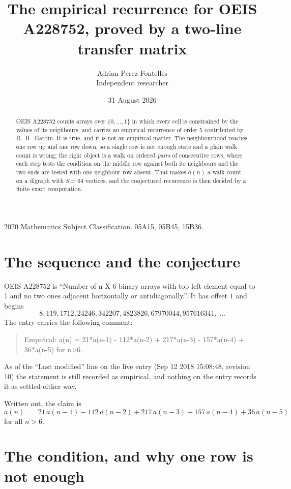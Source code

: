 \documentclass[11pt,a4paper]{article}
\title{The empirical recurrence for OEIS A228752, proved by a two-line transfer matrix}
\author{Adrian Perez Fontelles\\ \small Independent researcher}
\date{31 August 2026}
\theoremstyle{plain}
\theoremstyle{definition}
\begin{document}
\maketitle

\begin{abstract}
OEIS A228752 counts arrays over $\{0,\dots,1\}$ in which every cell is constrained by the
values of its neighbours, and carries an empirical recurrence of order $5$ contributed
by R.~H.~Hardin. It is true, and it is not an empirical matter. The neighbourhood reaches one
row up and one row down, so a single row is not enough state and a plain walk count
is wrong; the right object is a walk on ordered \emph{pairs} of consecutive rows, where
each step tests the condition on the middle row against both its neighbours and the two
ends are tested with one neighbour row absent. That makes $a(n)$ a walk count on a digraph
with $S=64$ vertices, and the conjectured recurrence is then decided by a finite exact
computation.
\end{abstract}

\noindent\small 2020 Mathematics Subject Classification. 05A15, 05B45, 15B36.\normalsize

\section{The sequence and the conjecture}

OEIS A228752 is ``Number of n X 6 binary arrays with top left element equal to 1 and no two ones adjacent horizontally or antidiagonally.''. It has offset $1$ and begins
\[
8, 119, 1712, 24246, 342207, 4823826, 67970044, 957616341,\ \dots
\]
The entry carries the following comment:
\begin{quote}\small
Empirical: a(n) = 21*a(n-1) - 112*a(n-2) + 217*a(n-3) - 157*a(n-4) + 36*a(n-5) for n>6.
\end{quote}
As of the ``Last modified'' line on the live entry (Sep 12 2018 15:08:48, revision 10) the statement is
still recorded as empirical, and nothing on the entry records it as settled either way.

Written out, the claim is
\begin{equation}\label{eq:conj}
a(n)\;=\;21\,a(n-1) - 112\,a(n-2) + 217\,a(n-3) - 157\,a(n-4) + 36\,a(n-5)
\end{equation}
for all $n>6$.

\section{The condition, and why one row is not enough}
\end{document}

